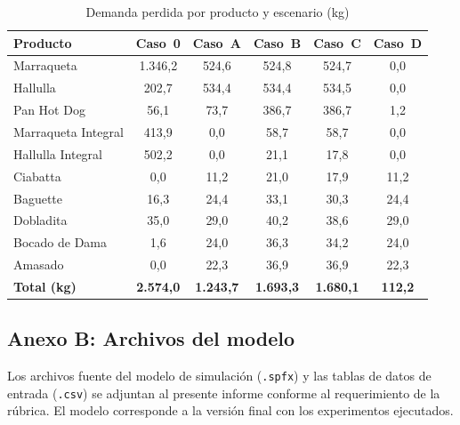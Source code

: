 \documentclass[12pt]{article}
\begin{document}
\begin{table}[H]
\centering
\caption{Demanda perdida por producto y escenario (kg)}
\label{tab:dem-perdida-producto}
\renewcommand{\arraystretch}{1.3}
\begin{tabularx}{\textwidth}{Xccccc}
\toprule
\rowcolor{tabhead}
\color{white}\textbf{Producto} &
\color{white}\textbf{Caso~0} &
\color{white}\textbf{Caso~A} &
\color{white}\textbf{Caso~B} &
\color{white}\textbf{Caso~C} &
\color{white}\textbf{Caso~D} \\
\midrule
\rowcolor{tabrow} Marraqueta          & 1.346,2 & 524,6 & 524,8 & 524,7 & 0,0 \\
Hallulla                              & 202,7 & 534,4 & 534,4 & 534,5 & 0,0 \\
\rowcolor{tabrow} Pan Hot Dog         & 56,1 & 73,7 & 386,7 & 386,7 & 1,2 \\
Marraqueta Integral                   & 413,9 & 0,0 & 58,7 & 58,7 & 0,0 \\
\rowcolor{tabrow} Hallulla Integral   & 502,2 & 0,0 & 21,1 & 17,8 & 0,0 \\
Ciabatta                              & 0,0 & 11,2 & 21,0 & 17,9 & 11,2 \\
\rowcolor{tabrow} Baguette            & 16,3 & 24,4 & 33,1 & 30,3 & 24,4 \\
Dobladita                             & 35,0 & 29,0 & 40,2 & 38,6 & 29,0 \\
\rowcolor{tabrow} Bocado de Dama      & 1,6 & 24,0 & 36,3 & 34,2 & 24,0 \\
Amasado                               & 0,0 & 22,3 & 36,9 & 36,9 & 22,3 \\
\midrule
\rowcolor{tabrow}\textbf{Total (kg)} & \textbf{2.574,0} & \textbf{1.243,7} & \textbf{1.693,3} & \textbf{1.680,1} & \textbf{112,2} \\
\bottomrule
\end{tabularx}
\end{table}

\subsection*{Anexo B: Archivos del modelo}

Los archivos fuente del modelo de simulación (\texttt{.spfx}) y las tablas de datos de entrada (\texttt{.csv}) se adjuntan al presente informe conforme al requerimiento de la rúbrica. El modelo corresponde a la versión final con los experimentos ejecutados.
\end{document}
